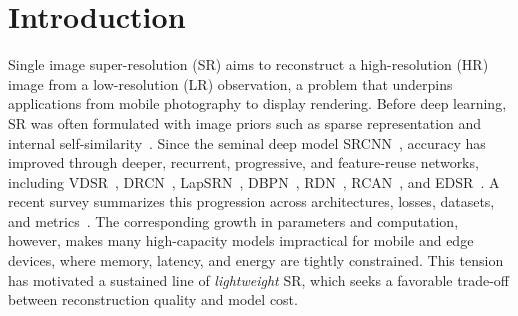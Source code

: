 \section{Introduction}
\label{sec:intro}

Single image super-resolution (SR) aims to reconstruct a high-resolution (HR)
image from a low-resolution (LR) observation, a problem that underpins applications
from mobile photography to display rendering. Before deep learning, SR was often
formulated with image priors such as sparse representation and internal
self-similarity~\cite{yang2010sparse,glasner2009single}. Since the seminal deep
model SRCNN~\cite{dong2014srcnn}, accuracy has improved through deeper,
recurrent, progressive, and feature-reuse networks, including
VDSR~\cite{kim2016vdsr}, DRCN~\cite{kim2016drcn}, LapSRN~\cite{lai2017lapsrn},
DBPN~\cite{haris2018dbpn}, RDN~\cite{zhang2018rdn}, RCAN~\cite{zhang2018rcan},
and EDSR~\cite{lim2017edsr}. A recent survey summarizes this progression across
architectures, losses, datasets, and metrics~\cite{wang2021survey}. The
corresponding growth in parameters and computation, however, makes many
high-capacity models impractical for mobile and edge devices, where memory,
latency, and energy are tightly constrained. This tension has motivated a sustained
line of \emph{lightweight} SR, which seeks a favorable
trade-off between reconstruction quality and model cost.

